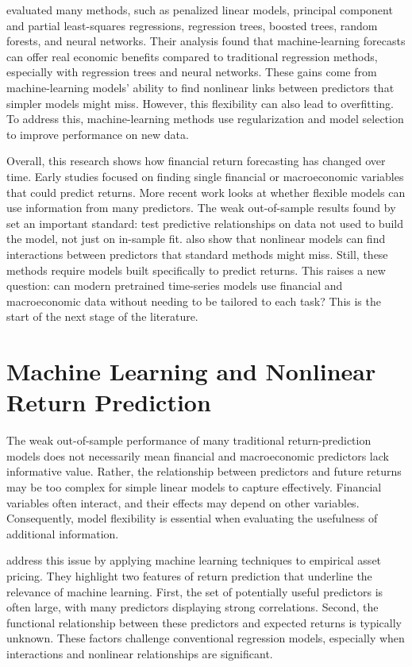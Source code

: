 \documentclass[12pt,a4paper,twoside,openany]{book}
\begin{document}
\cite{gu2020empirical} evaluated many methods, such as penalized linear models, principal component and partial least-squares regressions, regression trees, boosted trees, random forests, and neural networks. Their analysis found that machine-learning forecasts can offer real economic benefits compared to traditional regression methods, especially with regression trees and neural networks. These gains come from machine-learning models' ability to find nonlinear links between predictors that simpler models might miss. However, this flexibility can also lead to overfitting. To address this, machine-learning methods use regularization and model selection to improve performance on new data.

Overall, this research shows how financial return forecasting has changed over time. Early studies focused on finding single financial or macroeconomic variables that could predict returns. More recent work looks at whether flexible models can use information from many predictors. The weak out-of-sample results found by \cite{welch2008equity} set an important standard: test predictive relationships on data not used to build the model, not just on in-sample fit. \cite{gu2020empirical} also show that nonlinear models can find interactions between predictors that standard methods might miss. Still, these methods require models built specifically to predict returns. This raises a new question: can modern pretrained time-series models use financial and macroeconomic data without needing to be tailored to each task? This is the start of the next stage of the literature.


\section{Machine Learning and Nonlinear Return Prediction}
\label{machine-learning-and-nonlinear-return-prediction}

The weak out-of-sample performance of many traditional return-prediction models does not necessarily mean financial and macroeconomic predictors lack informative value. Rather, the relationship between predictors and future returns may be too complex for simple linear models to capture effectively. Financial variables often interact, and their effects may depend on other variables. Consequently, model flexibility is essential when evaluating the usefulness of additional information.

\cite{gu2020empirical} address this issue by applying machine learning techniques to empirical asset pricing. They highlight two features of return prediction that underline the relevance of machine learning. First, the set of potentially useful predictors is often large, with many predictors displaying strong correlations. Second, the functional relationship between these predictors and expected returns is typically unknown. These factors challenge conventional regression models, especially when interactions and nonlinear relationships are significant.
\end{document}
